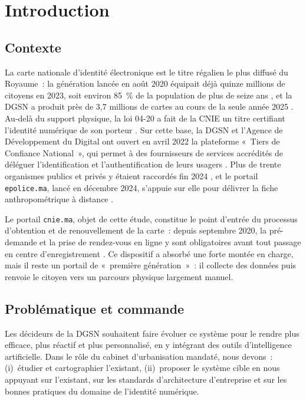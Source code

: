 \section{Introduction}

\subsection{Contexte}
La carte nationale d'identité électronique est le titre régalien le plus diffusé du Royaume~: la génération lancée en août 2020 équipait déjà quinze millions de citoyens en 2023, soit environ 85~\% de la population de plus de seize ans \cite{dgsn2023tcn}, et la DGSN a produit près de 3,7 millions de cartes au cours de la seule année 2025 \cite{lavieeco2025bilan}. Au-delà du support physique, la loi 04-20 a fait de la CNIE un titre certifiant l'identité numérique de son porteur \cite{loi0420}. Sur cette base, la DGSN et l'Agence de Développement du Digital ont ouvert en avril 2022 la plateforme «~Tiers de Confiance National~», qui permet à des fournisseurs de services accrédités de déléguer l'identification et l'authentification de leurs usagers \cite{lavieeco2022tcn}. Plus de trente organismes publics et privés y étaient raccordés fin 2024 \cite{allafrica2024bilan}, et le portail \texttt{epolice.ma}, lancé en décembre 2024, s'appuie sur elle pour délivrer la fiche anthropométrique à distance \cite{telquel2024epolice}.

Le portail \texttt{cnie.ma}, objet de cette étude, constitue le point d'entrée du processus d'obtention et de renouvellement de la carte~: depuis septembre 2020, la pré-demande et la prise de rendez-vous en ligne y sont obligatoires avant tout passage en centre d'enregistrement \cite{telquel2020rdv}. Ce dispositif a absorbé une forte montée en charge, mais il reste un portail de «~première génération~»~: il collecte des données puis renvoie le citoyen vers un parcours physique largement manuel.

\subsection{Problématique et commande}
Les décideurs de la DGSN souhaitent faire évoluer ce système pour le rendre plus efficace, plus réactif et plus personnalisé, en y intégrant des outils d'intelligence artificielle. Dans le rôle du cabinet d'urbanisation mandaté, nous devons~: (i)~étudier et cartographier l'existant, (ii)~proposer le système cible en nous appuyant sur l'existant, sur les standards d'architecture d'entreprise et sur les bonnes pratiques du domaine de l'identité numérique.

